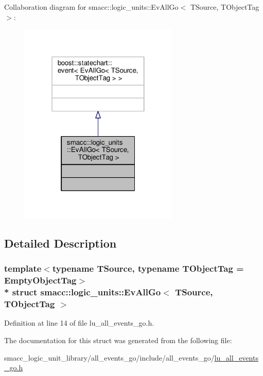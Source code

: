 Collaboration diagram for smacc\+:\+:logic\+\_\+units\+:\+:Ev\+All\+Go$<$ T\+Source, T\+Object\+Tag $>$\+:\nopagebreak
\begin{figure}[H]
\begin{center}
\leavevmode
\includegraphics[width=214pt]{structsmacc_1_1logic__units_1_1EvAllGo__coll__graph}
\end{center}
\end{figure}


\subsection{Detailed Description}
\subsubsection*{template$<$typename T\+Source, typename T\+Object\+Tag = Empty\+Object\+Tag$>$\\*
struct smacc\+::logic\+\_\+units\+::\+Ev\+All\+Go$<$ T\+Source, T\+Object\+Tag $>$}



Definition at line 14 of file lu\+\_\+all\+\_\+events\+\_\+go.\+h.



The documentation for this struct was generated from the following file\+:\begin{DoxyCompactItemize}
\item 
smacc\+\_\+logic\+\_\+unit\+\_\+library/all\+\_\+events\+\_\+go/include/all\+\_\+events\+\_\+go/\hyperlink{lu__all__events__go_8h}{lu\+\_\+all\+\_\+events\+\_\+go.\+h}\end{DoxyCompactItemize}
